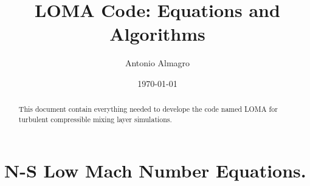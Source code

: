 \documentclass[titlepage,11pt]{article}
\begin{document}
\title{LOMA Code: Equations and Algorithms} %

\author{Antonio Almagro}%

\date{\today}

\maketitle %

\begin{abstract}
	This document contain everything needed to develope the code named LOMA for turbulent compressible mixing layer simulations.
\end{abstract}


\tableofcontents %






\section{N-S Low Mach Number Equations.}

\end{document}
